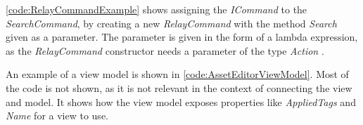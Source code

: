 \autoref{code:RelayCommandExample} shows assigning the \textit{ICommand} to the \textit{SearchCommand}, by creating a new \textit{RelayCommand} with the method \textit{Search} given as a parameter. The parameter is given in the form of a lambda expression, as the \textit{RelayCommand} constructor needs a parameter of the type \textit{Action} \citep{Action}. 
\par
An example of a view model is shown in \autoref{code:AssetEditorViewModel}. Most of the code is not shown, as it is not relevant in the context of connecting the view and model. It shows how the view model exposes properties like \textit{AppliedTags} and \textit{Name} for a view to use. 